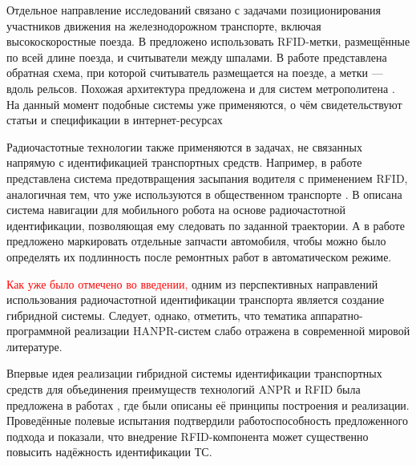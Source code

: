\documentclass[12pt]{article}
\theoremstyle{definition}
\begin{document}
Отдельное направление исследований связано с задачами позиционирования участников движения на железнодорожном транспорте, включая высокоскоростные поезда. В \cite{Zhang2010, Zhang2011} предложено использовать RFID-метки, размещённые по всей длине поезда, и считыватели между шпалами. В работе \cite{Buffi2017t} представлена обратная схема, при которой считыватель размещается на поезде, а метки — вдоль рельсов. Похожая архитектура предложена и для систем метрополитена \cite{Kostrominov2020}. На данный момент подобные системы уже применяются, о чём свидетельствуют статьи и спецификации в интернет-ресурсах \cite{train_pos_system, tag_master}

Радиочастотные технологии также применяются в задачах, не связанных напрямую с идентификацией транспортных средств. Например, в работе \cite{Yang2020} представлена система предотвращения засыпания водителя с применением RFID, аналогичная тем, что уже используются в общественном транспорте \cite{mosmetro_site}. В \cite{Teng2010} описана система навигации для мобильного робота на основе радиочастотной идентификации, позволяющая ему следовать по заданной траектории. А в работе \cite{Lakshmi2025} предложено маркировать отдельные запчасти автомобиля, чтобы можно было определять их подлинность после ремонтных работ в автоматическом режиме.

\textcolor{red}{Как уже было отмечено во введении,} одним из перспективных направлений использования радиочастотной идентификации транспорта является создание гибридной системы. Следует, однако, отметить, что тематика аппаратно-программной реализации HANPR-систем слабо отражена в современной мировой литературе.

Впервые идея реализации гибридной системы идентификации транспортных средств для объединения преимуществ технологий ANPR и RFID была предложена в работах \cite{VishnevskyMinnikhanov2012rfid, VishnevskyTselikin2012rfid, Vishnevsky2012, Vishn2013, Larionov2022hybrid, Vishnevsky2022}, где были описаны её принципы построения и реализации. Проведённые полевые испытания подтвердили работоспособность предложенного подхода и показали, что внедрение RFID-компонента может существенно повысить надёжность идентификации ТС.
\end{document}
